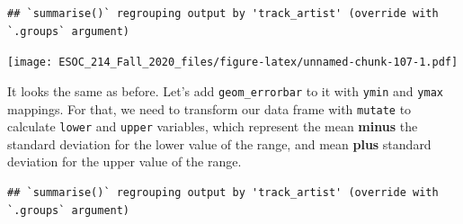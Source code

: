 \documentclass[
]{book}
\newenvironment{Shaded}{\begin{snugshade}}{\end{snugshade}}
\newcommand{\DataTypeTok}[1]{\textcolor[rgb]{0.13,0.29,0.53}{#1}}
\newcommand{\DecValTok}[1]{\textcolor[rgb]{0.00,0.00,0.81}{#1}}
\newcommand{\KeywordTok}[1]{\textcolor[rgb]{0.13,0.29,0.53}{\textbf{#1}}}
\newcommand{\NormalTok}[1]{#1}
\newcommand{\OperatorTok}[1]{\textcolor[rgb]{0.81,0.36,0.00}{\textbf{#1}}}
\newcommand{\StringTok}[1]{\textcolor[rgb]{0.31,0.60,0.02}{#1}}
\begin{document}
\begin{verbatim}
## `summarise()` regrouping output by 'track_artist' (override with `.groups` argument)
\end{verbatim}

\texttt{[image: ESOC\_214\_Fall\_2020\_files/figure-latex/unnamed-chunk-107-1.pdf]}

It looks the same as before. Let's add \texttt{geom\_errorbar} to it with \texttt{ymin} and \texttt{ymax} mappings. For that, we need to transform our data frame with \texttt{mutate} to calculate \texttt{lower} and \texttt{upper} variables, which represent the mean \textbf{minus} the standard deviation for the lower value of the range, and mean \textbf{plus} standard deviation for the upper value of the range.

\begin{Shaded}
\end{Shaded}

\begin{verbatim}
## `summarise()` regrouping output by 'track_artist' (override with `.groups` argument)
\end{verbatim}
\end{document}
